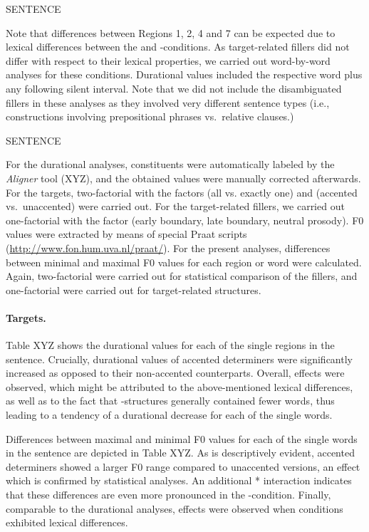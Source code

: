 \documentclass[fleqn,reqno,10pt,draft]{article}
\newcommand{\as}{\acro{as}}
\renewcommand{\es}{\acro{es}}
\begin{document}
\begin{exe}
  \ex SENTENCE
\end{exe}

Note that differences between Regions 1, 2, 4 and 7 can be expected
due to lexical differences between the \as and \es-conditions. As
target-related fillers did not differ with respect to their lexical
properties, we carried out word-by-word analyses for these
conditions. Durational values included the respective word plus any
following silent interval. Note that we did not include the
disambiguated fillers in these analyses as they involved very
different sentence types (i.e., constructions involving prepositional
phrases vs.~relative clauses.)

\begin{exe}
  \ex SENTENCE
\end{exe}

For the durational analyses, constituents were automatically labeled
by the \emph{Aligner} tool (XYZ), and the
obtained values were manually corrected afterwards. For the targets,
two-factorial  with the factors  (all
vs. exactly one) and  (accented vs.~unaccented) were
carried out. For the target-related fillers, we carried out
one-factorial  with the factor  (early
boundary, late boundary, neutral prosody). F0 values were extracted by
means of special Praat scripts
(\url{http://www.fon.hum.uva.nl/praat/}). For the present analyses,
differences between minimal and maximal F0 values for each region or
word were calculated. Again, two-factorial  were carried
out for statistical comparison of the fillers, and one-factorial
 were carried out for target-related structures.

\paragraph{Targets.} Table XYZ shows the durational values for each of
the single regions in the sentence. Crucially, durational values of
accented determiners were significantly increased as opposed to their
non-accented counterparts. Overall,  effects were
observed, which might be attributed to the above-mentioned lexical
differences, as well as to the fact that \es-structures generally
contained fewer words, thus leading to a tendency of a durational
decrease for each of the single words.

Differences between maximal and minimal F0 values for each of the
single words in the sentence are depicted in Table XYZ. As is
descriptively evident, accented determiners showed a larger F0 range
compared to unaccented versions, an effect which is confirmed by
statistical analyses. An additional *
interaction indicates that these differences are even more pronounced
in the \as-condition. Finally, comparable to the durational analyses,
 effects were observed when conditions exhibited
lexical differences.
\end{document}
